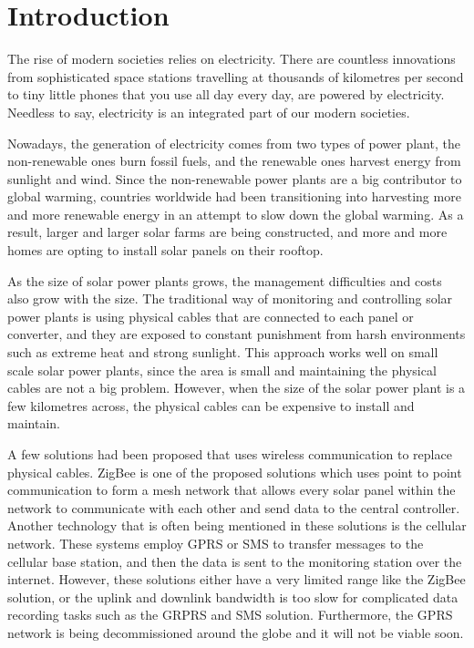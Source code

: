 \documentclass[../thesis.tex]{subfiles}
\begin{document}
\chapter{Introduction}

The rise of modern societies relies on electricity. There are countless innovations from sophisticated space stations travelling at thousands of kilometres per second to tiny little phones that you use all day every day, are powered by electricity. Needless to say, electricity is an integrated part of our modern societies.

Nowadays, the generation of electricity comes from two types of power plant, the non-renewable ones burn fossil fuels, and the renewable ones harvest energy from sunlight and wind\cite{Elecgen}. Since the non-renewable power plants are a big contributor to global warming, countries worldwide had been transitioning into harvesting more and more renewable energy in an attempt to slow down the global warming\cite{GrowingSolar}. As a result, larger and larger solar farms are being constructed, and more and more homes are opting to install solar panels on their rooftop.

As the size of solar power plants grows, the management difficulties and costs also grow with the size. The traditional way of monitoring and controlling solar power plants is using physical cables that are connected to each panel or converter, and they are exposed to constant punishment from harsh environments such as extreme heat and strong sunlight\cite{SHARIFF20151730}. This approach works well on small scale solar power plants, since the area is small and maintaining the physical cables are not a big problem. However, when the size of the solar power plant is a few kilometres across, the physical cables can be expensive to install and maintain\cite{SHARIFF20151730}.

A few solutions had been proposed that uses wireless communication to replace physical cables. ZigBee is one of the proposed solutions which uses point to point communication to form a mesh network that allows every solar panel within the network to communicate with each other and send data to the central controller\cite{SHARIFF20151730}. Another technology that is often being mentioned in these solutions is the cellular network. These systems employ GPRS or SMS to transfer messages to the cellular base station, and then the data is sent to the monitoring station over the internet\cite{AdhyaSoham2016AIbs,SiregarSimon2014Spab}. However, these solutions either have a very limited range like the ZigBee solution, or the uplink and downlink bandwidth is too slow for complicated data recording tasks such as the GRPRS and SMS solution. Furthermore, the GPRS network is being decommissioned around the globe and it will not be viable soon.
\end{document}
